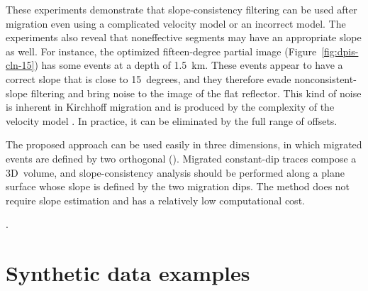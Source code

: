 
These experiments demonstrate that slope-consistency filtering can be used after migration even  using a complicated velocity model or an
incorrect model. 
The experiments also reveal that noneffective segments may have an appropriate slope as well. For instance, the optimized fifteen-degree
partial image (Figure~\ref{fig:dpis-cln-15}) has some events at a depth of 1.5~km. These events appear to have a correct slope that is 
close to 15~degrees, and they therefore evade nonconsistent-slope filtering and bring noise to the image of the flat reflector. This kind
of noise is inherent in Kirchhoff migration and is produced by the complexity of the velocity model . In practice, it can be eliminated by  the full range of offsets.

The proposed approach can be used easily in three dimensions, in which migrated events are defined by two orthogonal 
(\citealp[]{klokov12}). Migrated constant-dip traces compose a 3D~volume, and slope-consistency analysis should be performed along a plane
surface whose slope is defined
by the two migration dips. The method does not require slope estimation and has a relatively low computational cost.

.

\section{Synthetic data examples}

